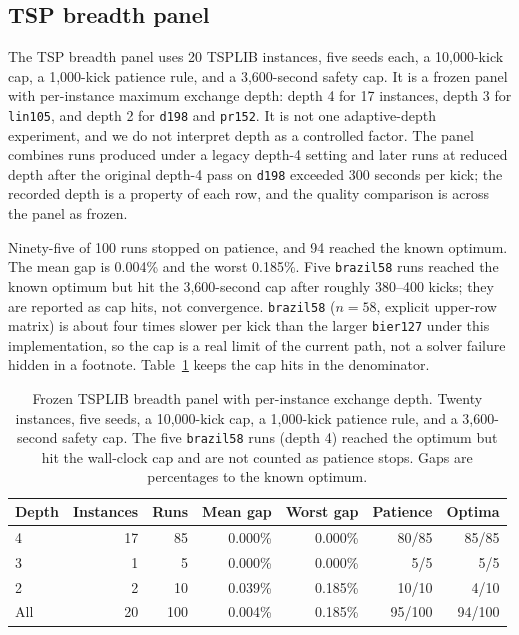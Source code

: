 \documentclass[10pt]{article}
\begin{document}
\subsection{TSP breadth panel}

The TSP breadth panel uses 20 TSPLIB instances, five seeds each, a 10,000-kick cap, a 1,000-kick
patience rule, and a 3,600-second safety cap. It is a frozen panel with per-instance maximum exchange
depth: depth 4 for 17 instances, depth 3 for \texttt{lin105}, and depth 2 for \texttt{d198} and
\texttt{pr152}. It is not one adaptive-depth experiment, and we do not interpret depth as a
controlled factor. The panel combines runs produced under a legacy depth-4 setting and later runs at
reduced depth after the original depth-4 pass on \texttt{d198} exceeded 300 seconds per kick; the
recorded depth is a property of each row, and the quality comparison is across the panel as frozen.

Ninety-five of 100 runs stopped on patience, and 94 reached the known optimum. The mean gap is
0.004\% and the worst 0.185\%. Five \texttt{brazil58} runs reached the known optimum but hit the
3,600-second cap after roughly 380--400 kicks; they are reported as cap hits, not convergence.
\texttt{brazil58} ($n=58$, explicit upper-row matrix) is about four times slower per kick than the
larger \texttt{bier127} under this implementation, so the cap is a real limit of the current path,
not a solver failure hidden in a footnote. Table~\ref{tab:tsp} keeps the cap hits in the
denominator.

\begin{table}[H]
\centering
\caption{Frozen TSPLIB breadth panel with per-instance exchange depth. Twenty instances, five seeds,
a 10,000-kick cap, a 1,000-kick patience rule, and a 3,600-second safety cap. The five
\texttt{brazil58} runs (depth 4) reached the optimum but hit the wall-clock cap and are not counted as
patience stops. Gaps are percentages to the known optimum.}
\label{tab:tsp}
\small
\begin{tabular}{lrrrrrr}
\toprule
Depth & Instances & Runs & Mean gap & Worst gap & Patience & Optima \\
\midrule
4 & 17 & 85 & 0.000\% & 0.000\% & 80/85 & 85/85 \\
3 & 1  & 5  & 0.000\% & 0.000\% & 5/5   & 5/5 \\
2 & 2  & 10 & 0.039\% & 0.185\% & 10/10 & 4/10 \\
\midrule
All & 20 & 100 & 0.004\% & 0.185\% & 95/100 & 94/100 \\
\bottomrule
\end{tabular}
\end{table}
\end{document}
